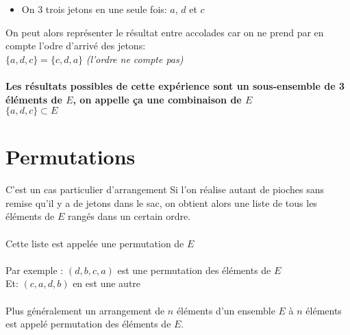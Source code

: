 \begin{itemize}
  \item On $3$ trois jetons en une seule fois: $a$, $d$ et $c$
\end{itemize}

On peut alors représenter le résultat entre accolades car on ne prend par en compte l'odre d'arrivé des jetons: \\ $\{ a, d, c \} = \{ c, d, a\}$ \emph{(l'ordre ne compte pas)} \\ \\
\textbf{Les résultats possibles de cette expérience sont un sous-ensemble de 3 éléments de $E$, on appelle ça une combinaison de $E$} \\
$\{a, d, c\} \subset E$

\pagebreak

\section{Permutations}
C'est un cas particulier d'arrangement
Si l’on réalise autant de pioches sans remise qu’il y a de jetons dans le sac, on obtient alors une liste de tous les éléments de $E$ rangés dans un certain ordre. \\ \\
Cette liste est appelée une permutation de $E$ \\ \\
Par exemple : $(d, b, c, a)$ est une permutation des éléments de $E$ \\
Et: $(c, a, d, b)$ en est une autre \\ \\
Plus généralement un arrangement de $n$ éléments d’un ensemble $E$ à $n$ éléments est appelé permutation des éléments de $E$.
